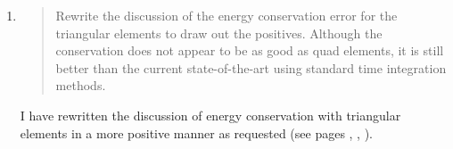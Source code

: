 \documentclass[12pt,a4paper,pdftex]{article}
\begin{document}
\begin{enumerate}
\item
  \begin{quotation}
    Rewrite the discussion of the energy conservation error for the
    triangular elements to draw out the positives. Although the
    conservation does not appear to be as good as quad elements, it is
    still better than the current state-of-the-art using standard time
    integration methods.
  \end{quotation}
  I have rewritten the discussion of energy conservation with triangular elements in a more positive manner as requested (see pages \pageref{sec:triangular-meshes}, \pageref{sec:numer-experiments-conclusions}, \pageref{sec:future-work}).

\end{enumerate}

\end{document}
